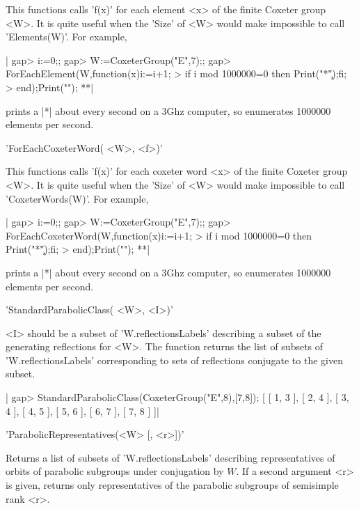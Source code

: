 This  functions calls  'f(x)' for  each element  <x> of  the finite Coxeter
group  <W>. It is quite useful when the 'Size' of <W> would make impossible
to call 'Elements(W)'. For example,

|    gap> i:=0;;
    gap> W:=CoxeterGroup("E",7);;
    gap> ForEachElement(W,function(x)i:=i+1;
    > if i mod 1000000=0 then Print("*\c");fi;
    > end);Print("\n");
    **|

prints  a |*| about every second on  a 3Ghz computer, so enumerates 1000000
elements per second.


'ForEachCoxeterWord( <W>, <f>)'

This functions calls 'f(x)' for each coxeter word <x> of the finite Coxeter
group  <W>. It is quite useful when the 'Size' of <W> would make impossible
to call 'CoxeterWords(W)'. For example,

|    gap> i:=0;;
    gap> W:=CoxeterGroup("E",7);;
    gap> ForEachCoxeterWord(W,function(x)i:=i+1;
    > if i mod 1000000=0 then Print("*\c");fi;
    > end);Print("\n");
    **|

prints  a |*| about every second on  a 3Ghz computer, so enumerates 1000000
elements per second.


'StandardParabolicClass( <W>, <I>)'

<I>  should be a subset of 'W.reflectionsLabels' describing a subset of the
generating reflections for <W>. The function returns the list of subsets of
'W.reflectionsLabels' corresponding to sets of reflections conjugate to the
given subset.

|    gap> StandardParabolicClass(CoxeterGroup("E",8),[7,8]);
    [ [ 1, 3 ], [ 2, 4 ], [ 3, 4 ], [ 4, 5 ], [ 5, 6 ], [ 6, 7 ],
      [ 7, 8 ] ]|


'ParabolicRepresentatives(<W> [, <r>])'

Returns   a   list   of   subsets   of   'W.reflectionsLabels'   describing
representatives  of orbits of parabolic subgroups under conjugation by $W$.
If  a second  argument <r>  is given,  returns only  representatives of the
parabolic subgroups of semisimple rank <r>.

